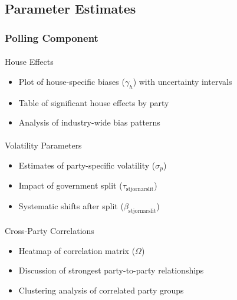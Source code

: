 \documentclass[
  letterpaper,
  DIV=11,
  numbers=noendperiod]{scrartcl}
\makeatletter
\let\oldparagraph\paragraph
\renewcommand{\paragraph}{
    \@ifstar
      \xxxParagraphStar
      \xxxParagraphNoStar
  }
\newcommand{\xxxParagraphStar}[1]{\oldparagraph*{#1}\mbox{}}
\newcommand{\xxxParagraphNoStar}[1]{\oldparagraph{#1}\mbox{}}
\providecommand{\tightlist}{%
  \setlength{\itemsep}{0pt}\setlength{\parskip}{0pt}}\usepackage{longtable,booktabs,array}
\makeatother
\begin{document}
\subsection{Parameter Estimates}\label{parameter-estimates}

\subsubsection{Polling Component}\label{polling-component-1}

\paragraph{House Effects}\label{house-effects}

\begin{itemize}
\tightlist
\item
  Plot of house-specific biases (\(\gamma_{h}\)) with uncertainty
  intervals
\item
  Table of significant house effects by party
\item
  Analysis of industry-wide bias patterns
\end{itemize}

\paragraph{Volatility Parameters}\label{volatility-parameters}

\begin{itemize}
\tightlist
\item
  Estimates of party-specific volatility (\(\sigma_p\))
\item
  Impact of government split (\(\tau_\text{stjornarslit}\))
\item
  Systematic shifts after split (\(\beta_\text{stjornarslit}\))
\end{itemize}

\paragraph{Cross-Party Correlations}\label{cross-party-correlations}

\begin{itemize}
\tightlist
\item
  Heatmap of correlation matrix (\(\Omega\))
\item
  Discussion of strongest party-to-party relationships
\item
  Clustering analysis of correlated party groups
\end{itemize}
\end{document}

